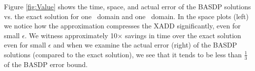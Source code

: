 Figure \ref{fig:Value} shows the time, space, and actual error of the
BASDP solutions vs. the exact solution for one \MarsRoverBi\ domain and one 
\Invent\ domain.  In the space plots (left) we notice how the
approximation compresses the XADD significantly, even for small
$\epsilon$.  We witness approximately 10$\times$ savings in time over
the exact solution even for small $\epsilon$ and when we examine the
actual error (right) of the BASDP solutions (compared to the exact
solution), we see that it tends to be less than
$\frac{1}{3}$ of the BASDP error bound.

